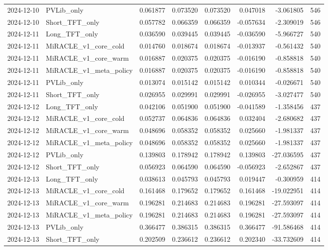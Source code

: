 \begin{tabular}{llrrrrrr}
2024-12-10 & PVLib_only & 0.061877 & 0.073520 & 0.073520 & 0.047018 & -3.061805 & 546 \\
2024-12-10 & Short_TFT_only & 0.057782 & 0.066359 & 0.066359 & -0.057634 & -2.309019 & 546 \\
2024-12-11 & Long_TFT_only & 0.036590 & 0.039445 & 0.039445 & -0.036590 & -5.966727 & 540 \\
2024-12-11 & MiRACLE_v1_core_cold & 0.014760 & 0.018674 & 0.018674 & -0.013937 & -0.561432 & 540 \\
2024-12-11 & MiRACLE_v1_core_warm & 0.016887 & 0.020375 & 0.020375 & -0.016190 & -0.858818 & 540 \\
2024-12-11 & MiRACLE_v1_meta_policy & 0.016887 & 0.020375 & 0.020375 & -0.016190 & -0.858818 & 540 \\
2024-12-11 & PVLib_only & 0.013074 & 0.015142 & 0.015142 & 0.010344 & -0.026671 & 540 \\
2024-12-11 & Short_TFT_only & 0.026955 & 0.029991 & 0.029991 & -0.026955 & -3.027477 & 540 \\
2024-12-12 & Long_TFT_only & 0.042106 & 0.051900 & 0.051900 & -0.041589 & -1.358456 & 437 \\
2024-12-12 & MiRACLE_v1_core_cold & 0.052737 & 0.064836 & 0.064836 & 0.032404 & -2.680682 & 437 \\
2024-12-12 & MiRACLE_v1_core_warm & 0.048696 & 0.058352 & 0.058352 & 0.025660 & -1.981337 & 437 \\
2024-12-12 & MiRACLE_v1_meta_policy & 0.048696 & 0.058352 & 0.058352 & 0.025660 & -1.981337 & 437 \\
2024-12-12 & PVLib_only & 0.139803 & 0.178942 & 0.178942 & 0.139803 & -27.036595 & 437 \\
2024-12-12 & Short_TFT_only & 0.056923 & 0.064590 & 0.064590 & -0.056923 & -2.652867 & 437 \\
2024-12-13 & Long_TFT_only & 0.038613 & 0.045793 & 0.045793 & 0.019447 & -0.300959 & 414 \\
2024-12-13 & MiRACLE_v1_core_cold & 0.161468 & 0.179652 & 0.179652 & 0.161468 & -19.022951 & 414 \\
2024-12-13 & MiRACLE_v1_core_warm & 0.196281 & 0.214683 & 0.214683 & 0.196281 & -27.593097 & 414 \\
2024-12-13 & MiRACLE_v1_meta_policy & 0.196281 & 0.214683 & 0.214683 & 0.196281 & -27.593097 & 414 \\
2024-12-13 & PVLib_only & 0.366477 & 0.386315 & 0.386315 & 0.366477 & -91.586468 & 414 \\
2024-12-13 & Short_TFT_only & 0.202509 & 0.236612 & 0.236612 & 0.202340 & -33.732609 & 414 \\

\end{tabular}
